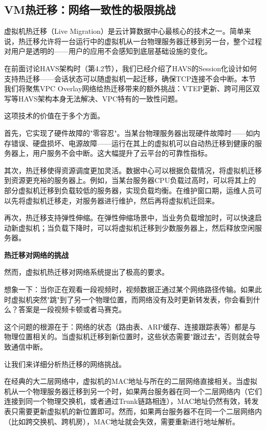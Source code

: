 \subsection{VM热迁移：网络一致性的极限挑战}

虚拟机热迁移（Live Migration）是云计算数据中心最核心的技术之一。简单来说，热迁移允许将一台运行中的虚拟机从一台物理服务器迁移到另一台，整个过程对用户是透明的——用户的应用不会感知到底层基础设施的变化。

在前面讨论HAVS架构时（第4.2节），我们已经介绍了HAVS的Session化设计如何支持热迁移——会话状态可以随虚拟机一起迁移，确保TCP连接不会中断。本节我们将聚焦VPC Overlay网络给热迁移带来的额外挑战：VTEP更新、跨可用区双写等HAVS架构本身无法解决、VPC特有的一致性问题。

这项技术的价值在于多个方面。

首先，它实现了硬件故障的"零容忍"。当某台物理服务器出现硬件故障时——如内存错误、硬盘损坏、电源故障——运行在其上的虚拟机可以自动热迁移到健康的服务器上，用户服务不会中断。这大幅提升了云平台的可靠性指标。

其次，热迁移使得资源调度更加灵活。数据中心可以根据负载情况，将虚拟机迁移到资源更充裕的服务器上。例如，当某台服务器CPU负载过高时，可以将其上的部分虚拟机迁移到负载较低的服务器，实现负载均衡。在维护窗口期，运维人员可以先将虚拟机迁移走，对服务器进行维护，然后再将虚拟机迁回来。

再次，热迁移支持弹性伸缩。在弹性伸缩场景中，当业务负载增加时，可以快速启动新虚拟机；当负载下降时，可以将虚拟机迁移到少数服务器上，然后释放空闲服务器。

\textbf{热迁移对网络的挑战}

然而，虚拟机热迁移对网络系统提出了极高的要求。

想象一下：当你正在观看一段视频时，视频数据正通过某个网络路径传输。如果此时虚拟机突然"跳"到了另一个物理位置，而网络没有及时更新转发表，你会看到什么？答案是一段视频卡顿或者马赛克。

这个问题的根源在于：网络的状态（路由表、ARP缓存、连接跟踪表等）都是与物理位置相关的。当虚拟机迁移到新位置时，这些状态需要"跟过去"，否则就会导致通信中断。

让我们来详细分析热迁移的网络挑战。

在经典的大二层网络中，虚拟机的MAC地址与所在的二层网络直接相关。当虚拟机从一个物理服务器迁移到另一个时，如果两台服务器在同一个二层网络内（它们连接到同一个物理交换机，或者通过Trunk链路相连），MAC地址仍然有效，转发表只需要更新虚拟机的新位置即可。然而，如果两台服务器不在同一个二层网络内（比如跨交换机、跨机房），MAC地址就会失效，需要重新进行地址解析。

